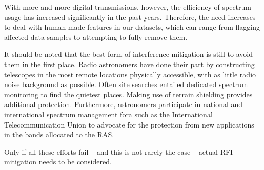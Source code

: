 
With more and more digital transmissions, however, the efficiency of spectrum usage has increased significantly in the past years. Therefore, the need increases to deal with human-made features in our datasets, which can range from flagging affected data samples to attempting to fully remove them.

It should be noted that the best form of interference mitigation is still to avoid them in the first place. Radio astronomers have done their part by constructing telescopes in the most remote locations physically accessible, with as little radio noise background as possible. Often site searches entailed dedicated spectrum monitoring to find the quietest places. Making use of terrain shielding provides additional protection. Furthermore, astronomers participate in national and international spectrum management fora such as the International Telecommunication Union to advocate for the protection from new applications in the bands allocated to the RAS.

Only if all these efforts fail -- and this is not rarely the case -- actual RFI mitigation needs to be considered.



